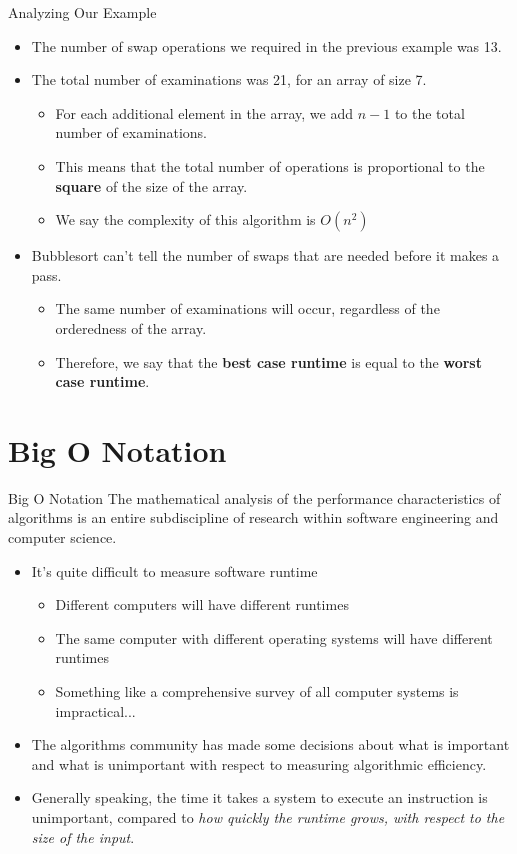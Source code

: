 \documentclass[11pt]{beamer}
\begin{document}
\begin{frame}{Analyzing Our Example}
\begin{itemize}
\item The number of swap operations we required in the previous example was 13.   
\item The total number of examinations was 21, for an array of size 7.
\begin{itemize}
\item For each additional element in the array, we add $n-1$ to the total number of examinations.
\item This means that the total number of operations is proportional to the \textbf{square} of the size of the array.
\item We say the complexity of this algorithm is $O(n^2)$
\end{itemize}
\item Bubblesort can't tell the number of swaps that are needed before it makes a pass.
\begin{itemize}
\item The same number of examinations will occur, regardless of the orderedness of the array.
\item Therefore, we say that the \textbf{best case runtime} is equal to the \textbf{worst case runtime}.
\end{itemize}
\end{itemize}
\end{frame}

\section[Big O]{Big O Notation}
\begin{frame}{Big O Notation}
The mathematical analysis of the performance characteristics of algorithms is an entire subdiscipline of research within software engineering and computer science.
\begin{itemize}
\item It's quite difficult to measure software runtime
\begin{itemize}
\item Different computers will have different runtimes
\item The same computer with different operating systems will have different runtimes
\item Something like a comprehensive survey of all computer systems is impractical...
\end{itemize}
\item The algorithms community has made some decisions about what is important and what is unimportant with respect to measuring algorithmic efficiency.
\item Generally speaking, the time it takes a system to execute an instruction is unimportant, compared to \emph{how quickly the runtime grows, with respect to the size of the input}.
\end{itemize}
\end{frame}
\end{document}
